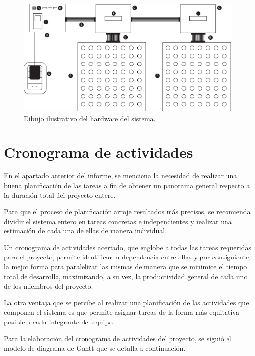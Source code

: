 	\begin{figure}[ht!]
		\begin{center}
			\centering
			\includegraphics[width=1.1\linewidth]{imagenes/dibujo-fisico.pdf}
			\caption{Dibujo ilustrativo del hardware del sistema.}
			\label{fig:dibujo-real}
		\end{center}
	\end{figure}

	
\section{Cronograma de actividades}

En el apartado anterior del informe, se menciona la necesidad de realizar una buena planificación de las tareas a fin de obtener un panorama general respecto a la duración total del proyecto entero.

Para que el proceso de planificación arroje resultados más precisos, se recomienda dividir el sistema entero en tareas concretas e independientes y realizar una estimación de cada una de ellas de manera individual.

Un cronograma de actividades acertado, que englobe a todas las tareas requeridas para el proyecto, permite identificar la dependencia entre ellas y por consiguiente, la mejor forma para paralelizar las mismas de manera que se minimice el tiempo total de desarrollo, maximizando, a su vez, la productividad general de cada uno de los miembros del proyecto.

La otra ventaja que se percibe al realizar una planificación de las actividades que componen el sistema es que permite asignar tareas de la forma más equitativa posible a cada integrante del equipo.

Para la elaboración del cronograma de actividades del proyecto, se siguió el modelo de diagrama de Gantt que se detalla a continuación.

